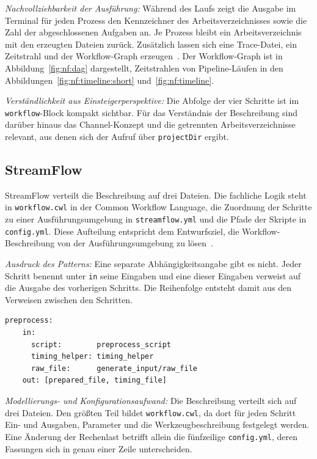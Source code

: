 \emph{Nachvollziehbarkeit der Ausführung:} Während des Laufs zeigt die
Ausgabe im Terminal für jeden Prozess den Kennzeichner des
Arbeitsverzeichnisses sowie die Zahl der abgeschlossenen Aufgaben an.
Je Prozess bleibt ein Arbeitsverzeichnis mit den erzeugten Dateien
zurück. Zusätzlich lassen sich eine Trace-Datei, ein Zeitstrahl und
der Workflow-Graph erzeugen~\cite{nextflowdocs-reports}. Der Workflow-Graph ist in
Abbildung~\ref{fig:nf:dag} dargestellt, Zeitstrahlen von
Pipeline-Läufen in den Abbildungen~\ref{fig:nf:timeline:short}
und~\ref{fig:nf:timeline}.

\emph{Verständlichkeit aus Einsteigerperspektive:} Die Abfolge der
vier Schritte ist im \texttt{workflow}-Block kompakt sichtbar. Für das
Verständnis der Beschreibung sind darüber hinaus das Channel-Konzept
und die getrennten Arbeitsverzeichnisse relevant, aus denen sich der
Aufruf über \texttt{projectDir} ergibt.

\subsection{StreamFlow}
\label{sec:lokal:pipeline:streamflow}

StreamFlow verteilt die Beschreibung auf drei Dateien. Die fachliche
Logik steht in \texttt{workflow.cwl} in der Common Workflow Language,
die Zuordnung der Schritte zu einer Ausführungsumgebung in
\texttt{streamflow.yml} und die Pfade der Skripte in
\texttt{config.yml}. Diese Aufteilung entspricht dem Entwurfsziel,
die Workflow-Beschreibung von der Ausführungsumgebung zu
lösen~\cite[S.~1723]{colonnelli2021streamflow}.

\emph{Ausdruck des Patterns:} Eine separate Abhängigkeitsangabe gibt
es nicht. Jeder Schritt benennt unter \texttt{in} seine Eingaben und
eine dieser Eingaben verweist auf die Ausgabe des vorherigen
Schritts. Die Reihenfolge entsteht damit aus den Verweisen zwischen
den Schritten.

\begin{lstlisting}[caption={Verweis auf die Ausgabe des Vorgängers in workflow.cwl (StreamFlow, Pipeline)},label={lst:pipe:sf}]
  preprocess:
    in:
      script:        preprocess_script
      timing_helper: timing_helper
      raw_file:      generate_input/raw_file
    out: [prepared_file, timing_file]
\end{lstlisting}

\emph{Modellierungs- und Konfigurationsaufwand:} Die Beschreibung
verteilt sich auf drei Dateien. Den größten Teil bildet
\texttt{workflow.cwl}, da dort für jeden Schritt Ein- und Ausgaben,
Parameter und die Werkzeugbeschreibung festgelegt werden. Eine
Änderung der Rechenlast betrifft allein die fünfzeilige
\texttt{config.yml}, deren Fassungen sich in genau einer Zeile
unterscheiden.

